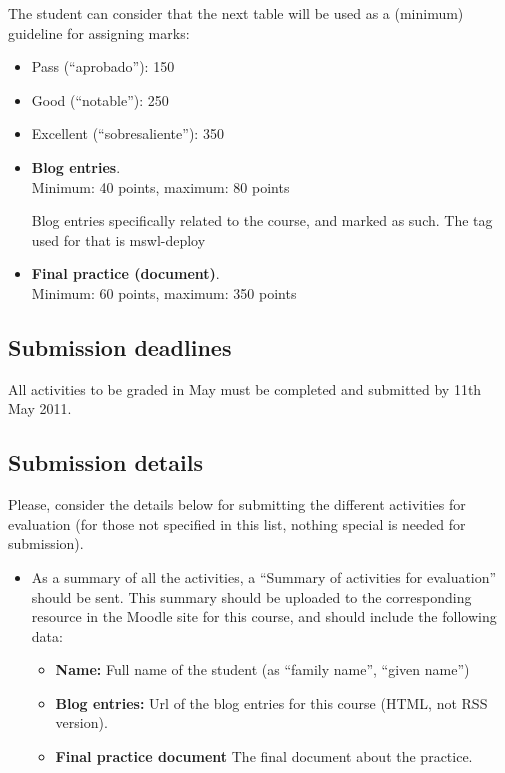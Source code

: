 \documentclass[a4paper]{article}
\begin{document}
The student can consider that the next table will be used as a
(minimum) guideline for assigning marks:

\begin{itemize}
\item Pass (``aprobado''): 150
\item Good (``notable''): 250
\item Excellent (``sobresaliente''): 350
\end{itemize}

\begin{itemize}
\item \textbf{Blog entries}. \\
  Minimum: 40 points, maximum: 80 points

  Blog entries specifically related to the course, and marked as such. The tag used for that is mswl-deploy


\item \textbf{Final practice (document)}. \\
  Minimum: 60 points, maximum: 350 points



\end{itemize}

\subsection{Submission deadlines}

All activities to be graded in May must be completed and submitted by 11th May 2011.

\subsection{Submission details}

Please, consider the details below for submitting the different activities for evaluation (for those not specified in this list, nothing special is needed for submission).

\begin{itemize}
\item As a summary of all the activities, a ``Summary of activities for evaluation'' should be sent. This summary should be uploaded to the corresponding resource in the Moodle site for this course, and should include the following data:
  \begin{itemize}
  \item \textbf{Name:} Full name of the student (as ``family name'', ``given name'')
  \item \textbf{Blog entries:} Url of the blog entries for this course (HTML, not RSS version).
  \item \textbf{Final practice document} The final document about the practice.  
  \end{itemize}
\end{itemize}
\end{document}
